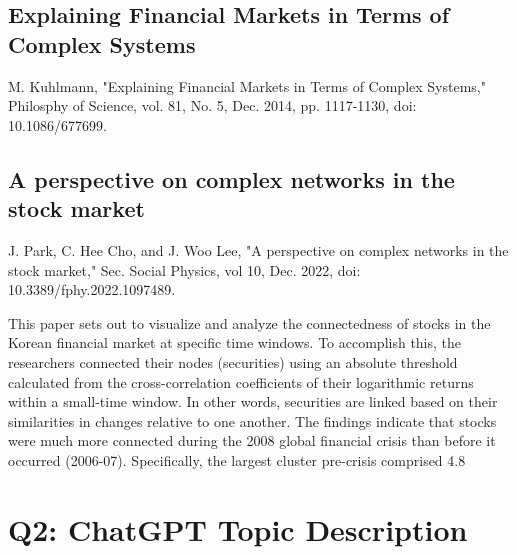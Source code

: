 \documentclass[12pt]{article}
\begin{document}
\subsection{Explaining Financial Markets in Terms of Complex Systems}
M. Kuhlmann, "Explaining Financial Markets in Terms of Complex Systems," Philosphy of Science, vol. 81, No. 5, Dec. 2014, pp. 1117-1130, doi: 10.1086/677699.



\subsection{A perspective on complex networks in the stock market}
J. Park, C. Hee Cho, and J. Woo Lee, "A perspective on complex networks in the stock market," Sec. Social Physics, vol 10, Dec. 2022, doi: 10.3389/fphy.2022.1097489.

This paper sets out to visualize and analyze the connectedness of stocks in the Korean financial market at specific time windows. To accomplish this, the researchers connected their nodes (securities) using an absolute threshold calculated from the cross-correlation coefficients of their logarithmic returns within a small-time window. In other words, securities are linked based on their similarities in changes relative to one another. The findings indicate that stocks were much more connected during the 2008 global financial crisis than before it occurred (2006-07). Specifically, the largest cluster pre-crisis comprised 4.8%

\section{Q2: ChatGPT Topic Description}


\end{document}

